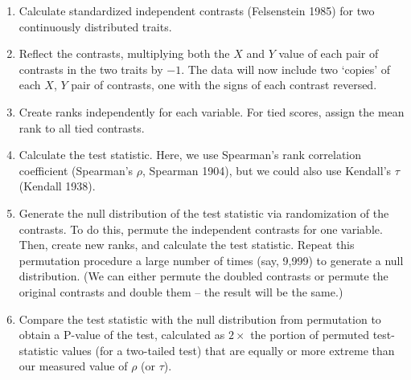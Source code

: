 \documentclass[fleqn,10pt,lineno]{wlpeerj} %
\begin{document}
\begin{enumerate}
\def\labelenumi{\arabic{enumi}.}
\item
  Calculate standardized independent contrasts (Felsenstein 1985) for two continuously distributed traits.
\item
  Reflect the contrasts, multiplying both the \(X\) and \(Y\) value of each pair of contrasts in the two traits by \(-1\). The data will now include two `copies' of each \(X\), \(Y\) pair of contrasts, one with the signs of each contrast reversed.
\item
  Create ranks independently for each variable. For tied scores, assign the mean rank to all tied contrasts.
\item
  Calculate the test statistic. Here, we use Spearman's rank correlation coefficient (Spearman's \(\rho\), Spearman 1904), but we could also use Kendall's \(\tau\) (Kendall 1938).
\item
  Generate the null distribution of the test statistic via randomization of the contrasts. To do this, permute the independent contrasts for one variable. Then, create new ranks, and calculate the test statistic. Repeat this permutation procedure a large number of times (say, 9,999) to generate a null distribution. (We can either permute the doubled contrasts or permute the original contrasts and double them -- the result will be the same.)
\item
  Compare the test statistic with the null distribution from permutation to obtain a P-value of the test, calculated as \(2 \times\) the portion of permuted test-statistic values (for a two-tailed test) that are equally or more extreme than our measured value of \(\rho\) (or \(\tau\)).
\end{enumerate}
\end{document}
